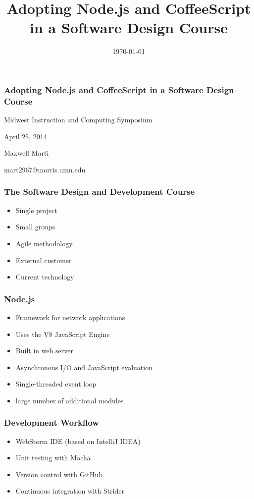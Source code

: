\documentclass{beamer}
\begin{document}
\title{Adopting Node.js and CoffeeScript in a Software Design Course}
\date{\today}

\begin{frame}
\frametitle{Adopting Node.js and CoffeeScript in a Software Design Course}
{\centering
Midwest Instruction and Computing Symposium\par
April 25, 2014\par
Maxwell Marti\par
mart2967@morris.umn.edu\par
}
\end{frame}




\begin{frame}[fragile]
\frametitle{The Software Design and Development Course}
	\begin{itemize}
  	 \item Single project
  	 \item Small groups
  	 \item Agile methodology
	 \item External customer
	 \item Current technology
	\end{itemize}
\end{frame}

\begin{frame}[fragile]
\frametitle{Node.js}
	\begin{itemize}
  	 \item Framework for network applications
  	 \item Uses the V8 JavaScript Engine
  	 \item Built in web server
	 \item Asynchronous I/O and JavaScript evaluation
	 \item Single-threaded event loop
	 \item large number of additional modules
	\end{itemize}
\end{frame}

\begin{frame}[fragile]
\frametitle{Development Workflow}
	\begin{itemize}
  	 \item WebStorm IDE (based on IntelliJ IDEA)
	 \item Unit testing with Mocha
  	 \item Version control with GitHub
  	 \item Continuous integration with Strider
	\end{itemize}
\end{frame}
\end{document}
